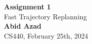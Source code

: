 \begin{titlepage}
    \begin{center}
    {\fontsize{40}{48}\selectfont \bfseries Assignment 1} 
    \\\vspace{20pt}
    {\LARGE Fast Trajectory Replanning} \\
    \vspace{20pt}
    \textbf{Abid Azad}
    \vspace{8pt}
    \\CS440, February 25th, 2024
    \end{center}

    \bigskip

\end{titlepage}
